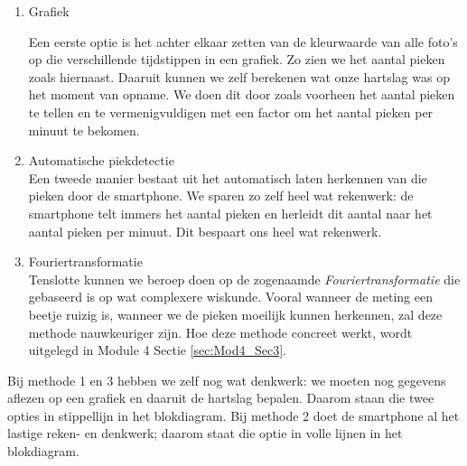 \begin{enumerate}
	\item Grafiek \\
	\begin{minipage}{.5\linewidth}
		Een eerste optie is het achter elkaar zetten van de kleurwaarde van alle foto's op die verschillende tijdstippen in een grafiek. Zo zien we het aantal pieken zoals hiernaast. 
	Daaruit kunnen we zelf berekenen wat onze hartslag was op het moment van opname. We doen dit door zoals voorheen het aantal pieken te tellen en te vermenigvuldigen met een factor om het aantal pieken per minuut te bekomen.
	\end{minipage}
	\begin{minipage}{.5\linewidth}
	\end{minipage}
	\item Automatische piekdetectie \\
	Een tweede manier bestaat uit het automatisch laten herkennen van die pieken door de smartphone. We sparen zo zelf heel wat rekenwerk: de smartphone telt immers het aantal pieken en herleidt dit aantal naar het aantal pieken per minuut.
	Dit bespaart ons heel wat rekenwerk.
	\item Fouriertransformatie \\
	Tenslotte kunnen we beroep doen op de zogenaamde \emph{Fouriertransformatie} die gebaseerd is op wat complexere wiskunde.
	Vooral wanneer de meting een beetje ruizig is, wanneer we de pieken moeilijk kunnen herkennen, zal deze methode nauwkeuriger zijn.
	Hoe deze methode concreet werkt, wordt uitgelegd in Module 4 Sectie \ref{sec:Mod4_Sec3}.
\end{enumerate}

Bij methode 1 en 3 hebben we zelf nog wat denkwerk: we moeten nog gegevens aflezen op een grafiek en daaruit de hartslag bepalen. Daarom staan die twee opties in stippellijn in het blokdiagram. Bij methode 2 doet de smartphone al het lastige reken- en denkwerk; daarom staat die optie in volle lijnen in het blokdiagram.





